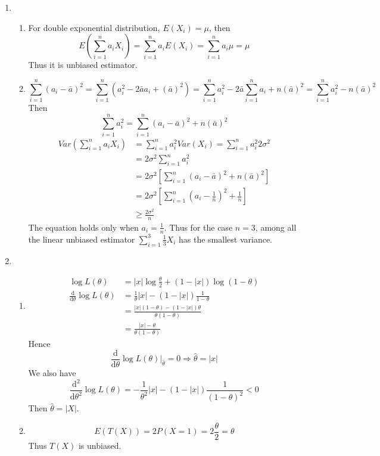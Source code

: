 \documentclass{article}
\begin{document}
\begin{enumerate}[leftmargin = 0 em, label = \arabic*., font = \bfseries]
\begin{enumerate}
 	 	\end{enumerate}
 	 	
 	 	\item 
 	 	\begin{enumerate}
 	 		\item 
 	 		For double exponential distribution, $E(X_i) = \mu$, then
 	 		\[E(\sum_{i=1}^n a_i X_i) = \sum_{i=1}^n a_i E(X_i) = \sum_{i=1}^n a_i \mu = \mu\]
 	 		Thus it is unbiased estimator.

 	 		\item 
 	 		\[\sum_{i=1}^n (a_i - \bar{a})^2 = \sum_{i=1}^n (a_i^2 - 2 \bar{a} a_i + (\bar{a})^2) = \sum_{i=1}^n a_i^2 - 2 \bar{a} \sum_{i=1}^n a_i + n (\bar{a})^2 = \sum_{i=1}^n a_i^2 - n (\bar{a})^2\]
 	 		Then 
 	 		\[\sum_{i=1}^n a_i^2 = \sum_{i=1}^n (a_i - \bar{a})^2 + n (\bar{a})^2\]
 	 		\begin{align*}
 	 		Var(\sum_{i=1}^n a_i X_i)& = \sum_{i=1}^n a_i^2 Var(X_i) = \sum_{i=1}^n a_i^2 2 \sigma^2\\
 	 		& = 2 \sigma^2 \sum_{i=1}^n a_i^2\\
 	 		& = 2 \sigma^2 \left[\sum_{i=1}^n (a_i - \bar{a})^2 + n (\bar{a})^2\right]\\
 	 		& = 2 \sigma^2 \left[\sum_{i=1}^n (a_i - \frac{1}{n})^2 + \frac{1}{n}\right]\\
 	 		& \geq \frac{2 \sigma^2}{n}
 	 		\end{align*}
 	 		The equation holds only when $a_i = \frac{1}{n}$. Thus for the case $n = 3$, among all the linear unbiased estimator $\sum_{i=1}^3 \frac{1}{3} X_i$ has the smallest variance.
 	 		
 	 	\end{enumerate}

 	 	\item 
 	 	\begin{enumerate}
 	 		\item 
 	 		\begin{align*}
 	 		\log L(\theta) &= |x| \log \frac{\theta}{2} + (1 - |x|) \log(1 - \theta)\\
 	 		\frac{\mathrm{d}}{\mathrm{d}\theta} \log L(\theta) &= \frac{1}{\theta} |x| - (1 - |x|) \frac{1}{1 - \theta}\\
 	 		& = \frac{|x|(1 - \theta) - (1 - |x|)\theta}{\theta(1 - \theta)}\\
 	 		& = \frac{|x| - \theta}{\theta(1 - \theta)}
 	 		\end{align*}
 	 		Hence
 	 		\[\frac{\mathrm{d}}{\mathrm{d}\theta} \log L(\theta) \bigg|_{\hat{\theta}} = 0 \Rightarrow \hat{\theta} = |x|\]
 	 		We also have 
 	 		\[\frac{\mathrm{d^2}}{\mathrm{d}\theta^2} \log L(\theta) = - \frac{1}{\theta^2} |x| - (1- |x|) \frac{1}{(1 - \theta)^2} < 0\]
 	 		Then $\hat{\theta} = |X|$.
 	 		\item 
 	 		\[E(T(X)) = 2 P(X = 1) = 2 \frac{\theta}{2} = \theta\]
 	 		Thus $T(X)$ is unbiased.


\end{enumerate}
\end{enumerate}
\end{document}
